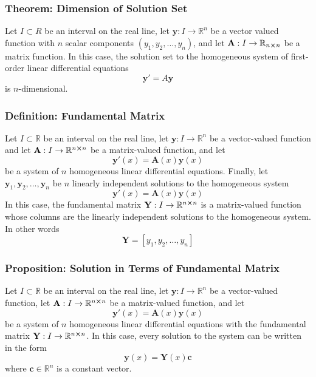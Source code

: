 \documentclass[11pt, a4paper]{article}
\newcommand{\R}{\mathbb{R}} %
\begin{document}
\subsubsection{Theorem: Dimension of Solution Set}
Let $ I \subset R$ be an interval on the real line, let $ \bm{y} : I \to \R^n$ be a vector valued function with $ n $ scalar components $ (y_1, y_2, \dots, y_n) $, and let $ \mathbf{A} : I \to \R_{n \cross n} $ be a matrix function. In this case, the solution set to the homogeneous system of first-order linear differential equations 
\begin{equation*}
	\bm{y}' = A \bm{y}
\end{equation*}
is $ n $-dimensional.


\subsubsection{Definition: Fundamental Matrix}
Let $ I \subset \R $ be an interval on the real line, let $ \bm{y} : I \to \R^n $ be a vector-valued function and let $ \mathbf{A} : I \to \R^{n \cross n} $ be a matrix-valued function, and let
\begin{equation*}
	\bm{y}'(x) = \mathbf{A}(x) \bm{y}(x)
\end{equation*}
be a system of $ n $ homogeneous linear differential equations. Finally, let $ \bm{y}_1, \bm{y}_2, \dots, \bm{y}_n $ be $ n $ linearly independent solutions to the homogeneous system
\begin{equation*}
	\bm{y}'(x) = \mathbf{A}(x) \bm{y}(x)
\end{equation*}
In this case, the fundamental matrix $ \mathbf{Y} : I \to \R^{n \cross n} $ is a matrix-valued function whose columns are the linearly independent solutions to the homogeneous system. In other words
\begin{equation*}
	\mathbf{Y} = [y_1, y_2, \dots, y_n]
\end{equation*}

\subsubsection{Proposition: Solution in Terms of Fundamental Matrix}
Let $ I \subset \R $ be an interval on the real line, let $ \bm{y} : I \to \R^n $ be a vector-valued function, let $ \mathbf{A} : I \to \R^{n \cross n} $ be a matrix-valued function, and let
\begin{equation*}
	\bm{y}'(x) = \mathbf{A}(x) \bm{y}(x)
\end{equation*}
be a system of $ n $ homogeneous linear differential equations with the fundamental matrix $  \mathbf{Y} : I \to \R^{n \cross n} $. In this case, every solution to the system can be written in the form
\begin{equation*}
	\bm{y}(x) = \mathbf{Y}(x) \bm{c}
\end{equation*}
where $ \bm{c} \in \R^n $ is a constant vector.
\end{document}
